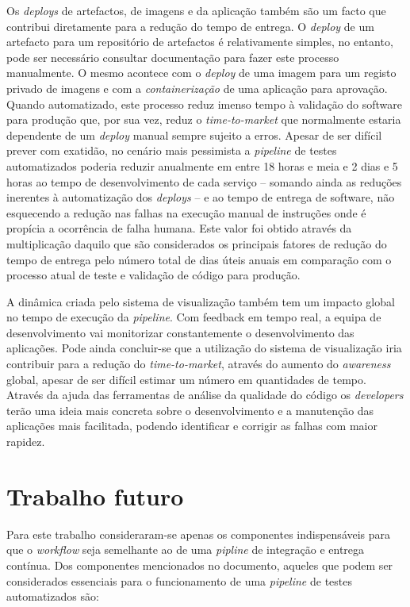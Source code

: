   \hspace{1cm}Os \textit{deploys} de artefactos, de imagens e da aplicação também são um facto que contribui diretamente para a redução do tempo de entrega. O \textit{deploy} de um artefacto para um repositório de artefactos é relativamente simples, no entanto, pode ser necessário consultar documentação para fazer este processo manualmente. O mesmo acontece com o \textit{deploy} de uma imagem para um registo privado de imagens e com a \textit{containerização} de uma aplicação para aprovação. Quando automatizado, este processo reduz imenso tempo à validação do software para produção que, por sua vez, reduz o \textit{time-to-market} que normalmente estaria dependente de um \textit{deploy} manual sempre sujeito a erros. Apesar de ser difícil prever com exatidão, no cenário mais pessimista a \textit{pipeline} de testes automatizados poderia reduzir anualmente em entre 18 horas e meia e 2 dias e 5 horas ao tempo de desenvolvimento de cada serviço -- somando ainda as reduções inerentes à automatização dos \textit{deploys} -- e ao tempo de entrega de software, não esquecendo a redução nas falhas na execução manual de instruções onde é propícia a ocorrência de falha humana. Este valor foi obtido através da multiplicação daquilo que são considerados os principais fatores de redução do tempo de entrega pelo número total de dias úteis anuais em comparação com o processo atual de teste e validação de código para produção.
 
 \hspace{1cm}A dinâmica criada pelo sistema de visualização também tem um impacto global no tempo de execução da \textit{pipeline}. Com feedback em tempo real, a equipa de desenvolvimento vai monitorizar constantemente o desenvolvimento das aplicações. Pode ainda concluir-se que a utilização do sistema de visualização iria contribuir para a redução do \textit{time-to-market}, através do aumento do \textit{awareness} global, apesar de ser difícil estimar um número em quantidades de tempo. Através da ajuda das ferramentas de análise da qualidade do código os \textit{developers} terão uma ideia mais concreta sobre o desenvolvimento e a manutenção das aplicações mais facilitada, podendo identificar e corrigir as falhas com maior rapidez.
 
 \section{Trabalho futuro}
 
 \hspace{1cm}Para este trabalho consideraram-se apenas os componentes indispensáveis para que o \textit{workflow} seja semelhante ao de uma \textit{pipline} de integração e entrega contínua. Dos componentes mencionados no documento, aqueles que podem ser considerados essenciais para o funcionamento de uma \textit{pipeline} de testes automatizados são:
 
